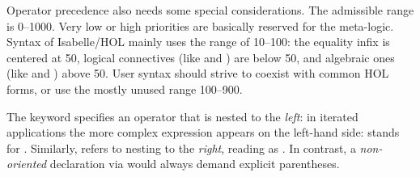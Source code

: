 \begin{isabellebody}
\begin{isamarkuptext}
  Operator precedence also needs some special considerations.  The
  admissible range is 0--1000.  Very low or high priorities are
  basically reserved for the meta-logic.  Syntax of Isabelle/HOL
  mainly uses the range of 10--100: the equality infix \isa{{\isacharequal}} is
  centered at 50, logical connectives (like \isa{{\isasymor}} and \isa{{\isasymand}}) are below 50, and algebraic ones (like \isa{{\isacharplus}} and \isa{{\isacharasterisk}}) above 50.  User syntax should strive to coexist with common
  HOL forms, or use the mostly unused range 100--900.

  \medskip The keyword  specifies an operator that
  is nested to the \emph{left}: in iterated applications the more
  complex expression appears on the left-hand side:  stands for .  Similarly,
   refers to nesting to the \emph{right}, reading
   as .  In contrast,
  a \emph{non-oriented} declaration via  would
  always demand explicit parentheses.


\end{isamarkuptext}
\end{isabellebody}
